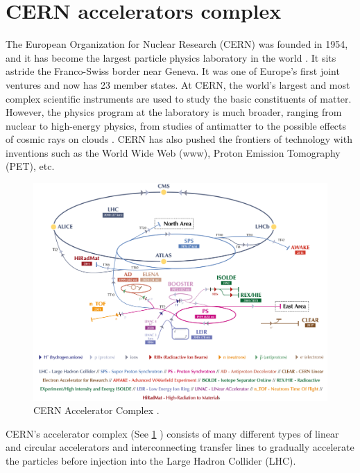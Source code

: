 \pagestyle{fancy}

\graphicspath{ {Figures/Chapter1_Overview/} }

\section{CERN accelerators complex}
\label{sec:CERN_acc_complex}

The European Organization for Nuclear Research (CERN) was founded in 1954, and it has become the largest particle physics laboratory in the world \parencite*[][]{ref:CernWebsite}. It sits astride the Franco-Swiss border near Geneva. It was one of Europe's first joint ventures and now has 23 member states. At CERN, the world's largest and most complex scientific instruments are used to study the basic constituents of matter. However, the physics program at the laboratory is much broader, ranging from nuclear to high-energy physics, from studies of antimatter to the possible effects of cosmic rays on clouds \parencite[][]{ref:PhysProgramCern}. CERN has also pushed the frontiers of technology with inventions such as the World Wide Web (www), Proton Emission Tomography (PET), etc.  

\begin{figure}[h]
    \centering
    \includegraphics[width=0.9\columnwidth]{Figure_AcceleratorChain/cernComplex.png}
    \caption{CERN Accelerator Complex \parencite*[][]{ref:cerncomplex} . }
    \label{fig:AccComplex}
\end{figure}

CERN's accelerator complex (See \ref{fig:AccComplex} ) consists of many different types of linear and circular accelerators and interconnecting transfer lines to gradually accelerate the particles before injection into the Large Hadron Collider (LHC). 

